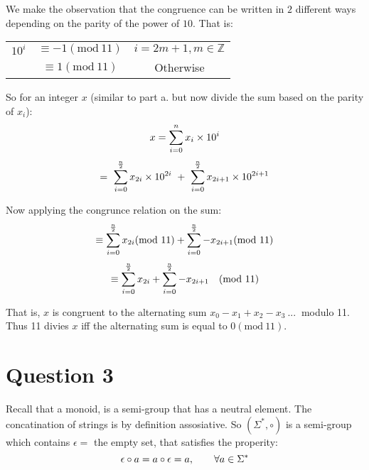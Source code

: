 \documentclass{article}
\numberwithin{equation}{subsection}
\begin{document}
	We make the observation that the congruence can be written in $2$ different ways
	depending on the parity of the power of $10$. That is:

	\begin{center}
		\begin{tabular}{c	c c}
			$10^i$ & $\equiv -1 (\textrm{mod}\ 11)$ & $i = 2m+1, m\in \mathbb{Z}$\\
						 & $\equiv 1(\textrm{mod}\ 11)$   & Otherwise
		\end{tabular}
	\end{center}

	\vspace{10pt}
	So for an integer $x$ (similar to part a. but now divide the sum based on the parity of $x_i$):
	\begin{equation}\notag
		x = \sum_{i=0}^n x_i \times 10^i
	\end{equation}
	\begin{equation}\notag
		= \ \sum_{i=0}^{\frac{n}{2}} x_{2i}	\times 10^{2i} \ + \ \sum_{i=0}^{\frac{n}{2}} x_{2i+1} \times 10^{2i+1}
	\end{equation}

	\newpage
	\thispagestyle{fancy}

	Now applying the congrunce relation on the sum:
	\begin{equation}\notag
	 \equiv \sum_{i=0}^{\frac{n}{2}} x_{2i} (\textrm{mod}\ 11) + \sum_{i=0}^{\frac{n}{2}} -x_{2i+1} (\textrm{mod}\ 11)	
	\end{equation}
	\begin{equation}\notag
	 \equiv \sum_{i=0}^{\frac{n}{2}} x_{2i}  + \sum_{i=0}^{\frac{n}{2}} -x_{2i+1}  \quad (\textrm{mod}\ 11)	
	\end{equation}

	That is, $x$ is congruent to the alternating sum $x_0 - x_1 + x_2 - x_3 \ ... \ $ modulo 11. Thus 11 divies
	$x$ iff the alternating sum is equal to $0(\textrm{mod}\ 11)$.

	\vspace{30pt}
	\section*{Question 3}
	Recall that a monoid, is a semi-group that has a neutral element. The concatination of strings
	is by definition assosiative. So $(\Sigma ^*, \circ)$ is a semi-group which contains $\epsilon =$ the empty set, 
	that satisfies the properity:
	\begin{equation}\notag
		\epsilon \circ a = a \circ \epsilon = a, \qquad \forall a \in \Sigma^*	
	\end{equation}
\end{document}
